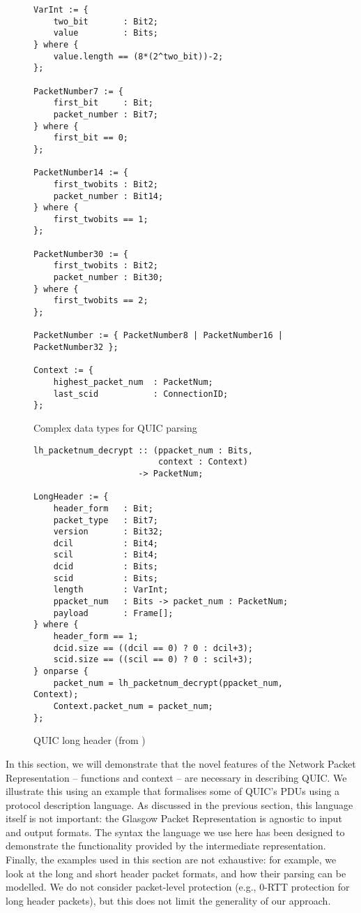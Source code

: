 \documentclass[10pt,sigconf]{acmart}
\begin{document}
\begin{figure}
	\vspace{3mm}
    \begin{BVerbatim}[fontsize=\scriptsize]
VarInt := {
	two_bit       : Bit2;
	value         : Bits;
} where {
	value.length == (8*(2^two_bit))-2;
};

PacketNumber7 := {
	first_bit     : Bit;
	packet_number : Bit7;
} where {
	first_bit == 0;
};

PacketNumber14 := {
	first_twobits : Bit2;
	packet_number : Bit14;
} where {
	first_twobits == 1;
};

PacketNumber30 := {
	first_twobits : Bit2;
	packet_number : Bit30;
} where {
	first_twobits == 2;
};

PacketNumber := { PacketNumber8 | PacketNumber16 | PacketNumber32 };
                     
Context := {
	highest_packet_num  : PacketNum;
	last_scid           : ConnectionID;
};
    \end{BVerbatim}
    \caption{Complex data types for QUIC parsing}
    \label{fig:quic-base}
\end{figure}

\begin{figure}
	\vspace{3mm}
    \begin{BVerbatim}[fontsize=\scriptsize]
lh_packetnum_decrypt :: (ppacket_num : Bits, 
                         context : Context) 
                     -> PacketNum;

LongHeader := {
	header_form   : Bit;
	packet_type   : Bit7;
	version       : Bit32;
	dcil          : Bit4;
	scil          : Bit4;
	dcid          : Bits;
	scid          : Bits;
	length        : VarInt;
	ppacket_num   : Bits -> packet_num : PacketNum;
	payload       : Frame[];
} where {
	header_form == 1;
	dcid.size == ((dcil == 0) ? 0 : dcil+3);
	scid.size == ((scil == 0) ? 0 : scil+3);
} onparse {
	packet_num = lh_packetnum_decrypt(ppacket_num, Context);
	Context.packet_num = packet_num;
};
    \end{BVerbatim}
    \caption{QUIC long header (from \cite{draft-ietf-quic-transport-latest})}
    \label{fig:quic-long-hdr-desc}
\end{figure}

In this section, we will demonstrate that the novel features of the Network Packet Representation
 -- functions and context -- are necessary in describing QUIC. We illustrate
this using an example that formalises some of QUIC's PDUs using a protocol description
language. As discussed in the previous section, this language itself is not important: the
Glasgow Packet Representation is agnostic to input and output formats. The syntax the
language we use here has been designed to demonstrate the functionality provided by the
intermediate representation. Finally, the examples used in this section are not exhaustive:
for example, we look at the long and short header packet formats, and how their parsing
can be modelled. We do not consider packet-level protection (e.g., 0-RTT protection for
long header packets), but this does not limit the generality of our approach.
\end{document}
